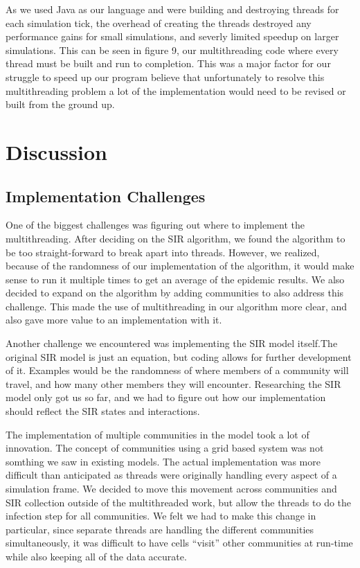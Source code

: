 \documentclass[conference]{IEEEtran}
\begin{document}
As we used Java as our language and were building and destroying threads for each simulation tick, the overhead of creating the threads destroyed any performance gains for small simulations, and severly limited speedup on larger simulations. This can be seen in figure 9, our multithreading code where every thread must be built and run to completion. This was a major factor for our struggle to speed up our program believe that unfortunately to resolve this multithreading problem a lot of the implementation would need to be revised or built from the ground up.


\section{Discussion}

\subsection{Implementation Challenges}

One of the biggest challenges was figuring out where to implement the multithreading. After deciding on the SIR algorithm, we found the algorithm to be too straight-forward to break apart into threads. However, we realized, because of the randomness of our implementation of the algorithm, it would make sense to run it multiple times to get an average of the epidemic results. We also decided to expand on the algorithm by adding communities to also address this challenge. This made the use of multithreading in our algorithm more clear, and also gave more value to an implementation with it.

Another challenge we encountered was implementing the SIR model itself.The original SIR model is just an equation, but coding allows for further development of it. Examples would be the randomness of where members of a community will travel, and how many other members they will encounter. Researching the SIR model only got us so far, and we had to figure out how our implementation should reflect the SIR states and interactions. 

The implementation of multiple communities in the model took a lot of innovation. The concept of communities using a grid based system was not somthing we saw in existing models. The actual implementation was more difficult than anticipated as threads were originally handling every aspect of a simulation frame. We decided to move this movement across communities and SIR collection outside of the multithreaded work, but allow the threads to do the infection step for all communities. We felt we had to make this change in particular, since separate threads are handling the different communities simultaneously, it was difficult to have cells “visit” other communities at run-time while also keeping all of the data accurate. 
\end{document}
